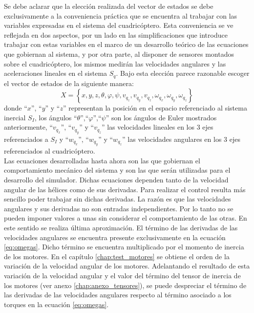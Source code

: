 \documentclass[main]{subfiles}
\begin{document}
Se debe aclarar que la elecci\'on realizada del vector de estados se debe exclusivamente a la conveniencia pr\'actica que se encuentra al trabajar con las variables expresadas en el sistema del cuadric\'optero. Esta conveniencia se ve reflejada en dos aspectos, por un lado en las simplificaciones que introduce trabajar con estas variables en el marco de un desarrollo te\'orico de las ecuaciones que gobiernan al sistema, y por otra parte, al disponer de sensores montados sobre el cuadric\'optero, los mismos medir\'an las velocidades angulares y las aceleraciones lineales en el sistema $S_q$. Bajo esta elecci\'on parece razonable escoger el vector de estados de la siguiente manera:
\begin{equation}
\boxed{X=\left\lbrace  x,y,z, \theta,\varphi,\psi, v_{q_z},v_{q_y},v_{q_z},\omega_{q_x},\omega_{q_y},\omega_{q_z} \right\rbrace}
\end{equation}
donde ``$x$'', ``$y$'' y ``$z$'' representan la posici\'on en el espacio referenciado al sistema inercial $S_I$, los \'angulos ``$\theta$'',``$\varphi$'',``$\psi$'' son los \'angulos de Euler mostrados anteriormente, ``$v_{q_x}$'', ``$v_{q_y}$'' y ``$v_{q_z}$'' las velocidades lineales en los 3 ejes referenciados a $S_I$ y ``$w_{q_x}$'', ``$w_{q_y}$'' y ``$w_{q_z}$'' las velocidades angulares en los 3 ejes referenciados al cuadric\'optero.\\

Las ecuaciones desarrolladas hasta ahora son las que gobiernan el comportamiento mec\'anico del sistema y son las que ser\'an utilizadas para el desarrollo del simulador. Dichas ecuaciones dependen tanto de la velocidad angular de las h\'elices como de sus derivadas. Para realizar el control resulta m\'as sencillo poder trabajar sin dichas derivadas. La raz\'on es que las velocidades angulares y sus derivadas no son entradas independientes. Por lo tanto no se pueden imponer valores a unas sin considerar el comportamiento de las otras. En este sentido se realiza \'ultima aproximaci\'on. El t\'ermino de las derivadas de las velocidades angulares se encuentra presente exclusivamente en la ecuaci\'on \ref{eq:omegas}. Dicho t\'ermino se encuentra multiplicado por el momento de inercia de los motores. En el cap\'itulo \ref{chap:test_motores} se obtiene el orden de la variaci\'on de la velocidad angular de los motores. Adelantando el resultado de esta variaci\'on de la velocidad angular y el valor del t\'ermino del tensor de inercia de los motores (ver anexo \ref{chap:anexo_tensores}), se puede despreciar el t\'ermino de las derivadas de las velocidades angulares respecto al t\'ermino asociado a los torques en la ecuaci\'on \ref{eq:omegas}.\\
\end{document}
